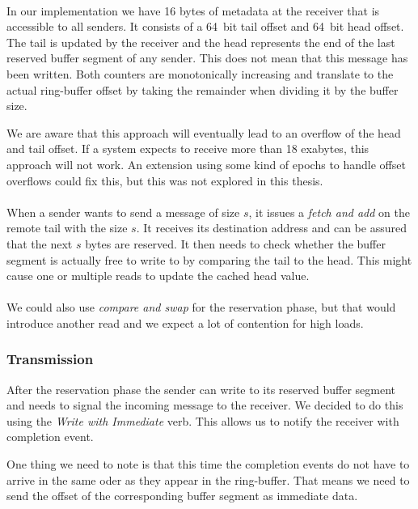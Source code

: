 \paragraph{} In our implementation we have 16 bytes of metadata at the receiver that is accessible to all senders. It consists
of a 64~bit tail offset and 64~bit head offset. The tail is updated by the receiver and the head represents the end of the
last reserved buffer segment of any sender. This does not mean that this message has been written. Both counters are
monotonically increasing and translate to the actual ring-buffer offset by taking the remainder when dividing it by
the buffer size.

We are aware that this approach will eventually lead to an overflow of the head and tail offset. If a system expects to receive
more than 18 exabytes, this approach will not work. An extension using some kind of epochs to handle offset overflows could
fix this, but this was not explored in this thesis.

\paragraph{}When a sender wants to send a message of size $s$, it issues a \emph{fetch and add} on the remote tail with the 
size $s$. It receives its destination address and can be assured that the next $s$ bytes are reserved. It then needs
to check whether the buffer segment is actually free to write to by comparing the tail to the head. This might cause one 
or multiple reads to update the cached head value.

\paragraph{} We could also use \emph{compare and swap} for the reservation phase, but that would introduce another read and
we expect a lot of contention for high loads.

\subsubsection{Transmission}
After the reservation phase the sender can write to its reserved buffer segment and needs to signal the incoming message
to the receiver. We decided to do this using the \emph{Write with Immediate} verb. This allows us to notify the receiver 
with completion event. 

One thing we need to note is that this time the completion events do not have to arrive in the same oder as they appear in
the ring-buffer. That means we need to send the offset of the corresponding buffer segment as immediate data.


